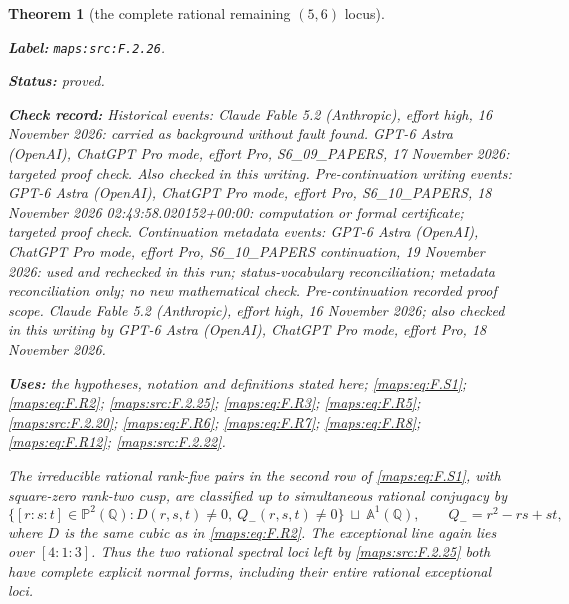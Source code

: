 \documentclass[11pt,a4paper]{article}
\newtheorem{theorem}{Theorem}[section]
\theoremstyle{definition}
\newcommand{\StatementRecord}[4]{\par\smallskip\begingroup\upshape\raggedright\noindent\textbf{Label:} \nolinkurl{#1}.\par\noindent\textbf{Status:} #2.\par\noindent\textbf{Check record:} #3.\par\noindent\textbf{Uses:} #4.\par\endgroup\smallskip}
\begin{document}
\begin{theorem}[the complete rational remaining $(5,6)$ locus]\label{maps:src:F.2.26}
\StatementRecord{maps:src:F.2.26}{proved}{Historical events: Claude Fable 5.2 (Anthropic), effort high, 16 November 2026: carried as background without fault found. GPT-6 Astra (OpenAI), ChatGPT Pro mode, effort Pro, S6\_09\_PAPERS, 17 November 2026: targeted proof check. Also checked in this writing. Pre-continuation writing events: GPT-6 Astra (OpenAI), ChatGPT Pro mode, effort Pro, S6\_10\_PAPERS, 18 November 2026 02:43:58.020152+00:00: computation or formal certificate; targeted proof check. Continuation metadata events: GPT-6 Astra (OpenAI), ChatGPT Pro mode, effort Pro, S6\_10\_PAPERS continuation, 19 November 2026: used and rechecked in this run; status-vocabulary reconciliation; metadata reconciliation only; no new mathematical check. \emph{Pre-continuation recorded proof scope.} Claude Fable 5.2 (Anthropic), effort high, 16 November 2026; also checked in this writing by GPT-6 Astra (OpenAI), ChatGPT Pro mode, effort Pro, 18 November 2026}{the hypotheses, notation and definitions stated here; \cref{maps:eq:F.S1}; \cref{maps:eq:F.R2}; \cref{maps:src:F.2.25}; \cref{maps:eq:F.R3}; \cref{maps:eq:F.R5}; \cref{maps:src:F.2.20}; \cref{maps:eq:F.R6}; \cref{maps:eq:F.R7}; \cref{maps:eq:F.R8}; \cref{maps:eq:F.R12}; \cref{maps:src:F.2.22}}


The irreducible rational rank-five pairs in the second row
of \eqref{maps:eq:F.S1}, with square-zero rank-two cusp, are classified
up to simultaneous rational conjugacy by
\[
 \{[r:s:t]\in\mathbb P^2(\mathbb Q):
             D(r,s,t)\ne0,\ Q_-(r,s,t)\ne0\}
       \ \sqcup\ \mathbb A^1(\mathbb Q),
 \qquad Q_-=r^2-rs+st,
 \tag{F.R10}\label{maps:eq:F.R10}
\]
where $D$ is the same cubic as in \eqref{maps:eq:F.R2}.
The exceptional line again lies over $[4:1:3]$.
Thus the two rational spectral loci left by \ref{maps:src:F.2.25} both
have complete explicit normal forms, including their
entire rational exceptional loci.

\end{theorem}
\end{document}
